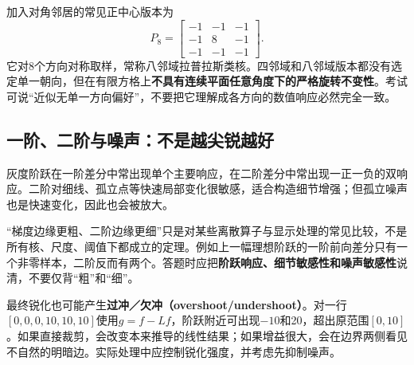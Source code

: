 加入对角邻居的常见正中心版本为
\[
 P_8=\begin{bmatrix}-1&-1&-1\\-1&8&-1\\-1&-1&-1\end{bmatrix}.
\]
它对8个方向对称取样，常称八邻域拉普拉斯类核。四邻域和八邻域版本都没有选定单一朝向，但在有限方格上\textbf{不具有连续平面任意角度下的严格旋转不变性}。考试可说“近似无单一方向偏好”，不要把它理解成各方向的数值响应必然完全一致。

\subsection{一阶、二阶与噪声：不是越尖锐越好}
灰度阶跃在一阶差分中常出现单个主要响应，在二阶差分中常出现一正一负的双响应。二阶对细线、孤立点等快速局部变化很敏感，适合构造细节增强；但孤立噪声也是快速变化，因此也会被放大。

“梯度边缘更粗、二阶边缘更细”只是对某些离散算子与显示处理的常见比较，不是所有核、尺度、阈值下都成立的定理。例如上一幅理想阶跃的一阶前向差分只有一个非零样本，二阶反而有两个。答题时应把\textbf{阶跃响应、细节敏感性和噪声敏感性}说清，不要仅背“粗”和“细”。

最终锐化也可能产生\textbf{过冲／欠冲（overshoot/undershoot）}。对一行$[0,0,0,10,10,10]$使用$g=f-Lf$，阶跃附近可出现$-10$和20，超出原范围$[0,10]$。如果直接裁剪，会改变本来推导的线性结果；如果增益很大，会在边界两侧看见不自然的明暗边。实际处理中应控制锐化强度，并考虑先抑制噪声。

